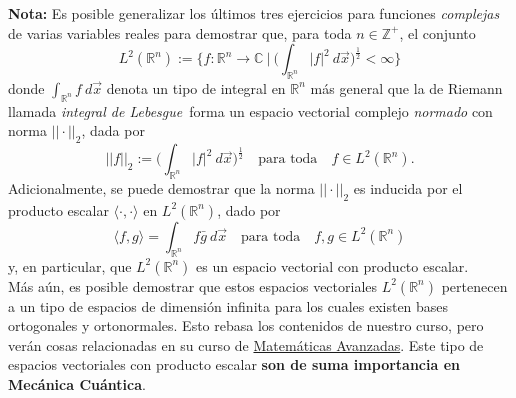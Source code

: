 \documentclass[a4paper]{article}
\begin{document}
\textbf{Nota:} Es posible generalizar los últimos tres ejercicios para funciones \emph{complejas} de varias variables reales para demostrar que, para toda $n\in\mathbb{Z}^+$, el conjunto
\[
    L^2(\mathbb{R}^n) := \bigg\{ f:\mathbb{R}^n\to \mathbb{C} \ \bigg| \ \bigg( \int_{\mathbb{R}^n} |f|^2 \ d\vec{x} \bigg)^{\frac{1}{2}} < \infty \bigg\}
\] 
\textemdash donde $\int_{\mathbb{R}^n} f \ d\vec{x}$ denota un tipo de integral en $\mathbb{R}^n$ más general que la de Riemann llamada \emph{integral de Lebesgue}\textemdash \ forma un espacio vectorial complejo \emph{normado} con norma $||\cdot||_2$, dada por 
\[
    ||f||_2:=\bigg(\int_{\mathbb{R}^n} |f|^2 \ d\vec{x}\bigg)^\frac{1}{2} \quad \text{para toda} \quad f\in L^2(\mathbb{R}^n).
\] 
Adicionalmente, se puede demostrar que la norma $||\cdot||_2$ es inducida por el producto escalar $\langle \cdot , \cdot \rangle$ en $L^2(\mathbb{R}^n)$, dado por
\[
    \langle f , g \rangle = \int_{\mathbb{R}^n} f \bar{g} \ d\vec{x} \quad \text{para toda} \quad f,g\in L^2(\mathbb{R}^n)
\] 
y, en particular, que $L^2(\mathbb{R}^n)$ es un espacio vectorial con producto escalar. \\

\noindent Más aún, es posible demostrar que estos espacios vectoriales $L^2(\mathbb{R}^n)$ pertenecen a un tipo de espacios de dimensión infinita para los cuales existen bases ortogonales y ortonormales. Esto rebasa los contenidos de nuestro curso, pero verán cosas relacionadas en su curso de \href{https://web.fciencias.unam.mx/asignaturas/1531.pdf}{Matemáticas Avanzadas}. Este tipo de espacios vectoriales con producto escalar \textbf{son de suma importancia en Mecánica Cuántica}.
\end{document}
